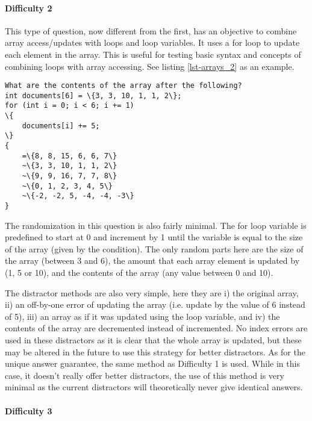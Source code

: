 \documentclass{article}
\begin{document}
\paragraph{Difficulty 2} \hfill \par

This type of question, now different from the first, has an objective to combine array access/updates with loops and loop variables. It uses a for loop to update each element in the array. This is
useful for testing basic syntax and concepts of combining loops with array accessing. See listing \ref{lst-arrays_2} as an example. 

\begin{lstlisting}[caption={\textbf{Arrays} Difficulty 2 GIFT Example}, label=lst-arrays_2, float]
What are the contents of the array after the following?
int documents[6] = \{3, 3, 10, 1, 1, 2\};
for (int i = 0; i < 6; i += 1)
\{ 
	documents[i] += 5; 
\}
{
	=\{8, 8, 15, 6, 6, 7\}
	~\{3, 3, 10, 1, 1, 2\}
	~\{9, 9, 16, 7, 7, 8\}
	~\{0, 1, 2, 3, 4, 5\}
	~\{-2, -2, 5, -4, -4, -3\}
} 
\end{lstlisting}


The randomization in this question is also fairly minimal. The for loop variable is predefined to start at 0 and increment by 1 until the variable is equal to the size of the array (given by the 
condition). The only random parts here are the size of the array (between 3 and 6), the amount that each array element is updated by (1, 5 or 10), and the contents of the array (any value 
between 0 and 10). 

The distractor methods are also very simple, here they are i) the original array, ii) an off-by-one error of updating the array (i.e. update by the value of 6 instead of 5), iii) an array as if it was
updated using the loop variable, and iv) the contents of the array are decremented instead of incremented. No index errors are used in these distractors as it is clear that the whole array is 
updated, but these may be altered in the future to use this strategy for better distractors. As for the unique answer guarantee, the same method as Difficulty 1 is used. While in this case, it
doesn't really offer better distractors, the use of this method is very minimal as the current distractors will theoretically never give identical answers. 

\paragraph{Difficulty 3} \hfill \par
\end{document}
